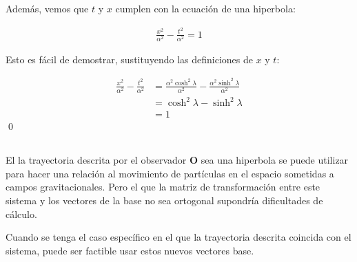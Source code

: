 Además, vemos que $t$ y $x$ cumplen con la ecuación de una hiperbola:

\begin{align*}
    \frac{x^2}{\alpha^2}-\frac{t^2}{\alpha^2}=1
\end{align*}

Esto es fácil de demostrar, sustituyendo las definiciones de $x$ y $t$:

\begin{align*}
    \frac{x^2}{\alpha^2}-\frac{t^2}{\alpha^2}
        &=\frac{\alpha^2\cosh^2\lambda}{\alpha^2}-\frac{\alpha^2\sinh^2\lambda}{\alpha^2}\\
        &=\cosh^2\lambda-\sinh^2\lambda\\
        &=1
\end{align*}
\qed


\subsection{}

El la trayectoria descrita por el observador \textbf{O} sea una hiperbola se puede utilizar para hacer una relación al movimiento de partículas en el espacio sometidas a campos gravitacionales. Pero el que la matriz de transformación entre este sistema y los vectores de la base no sea ortogonal supondría dificultades de cálculo.

Cuando se tenga el caso específico en el que la trayectoria descrita coincida con el sistema, puede ser factible usar estos nuevos vectores base.